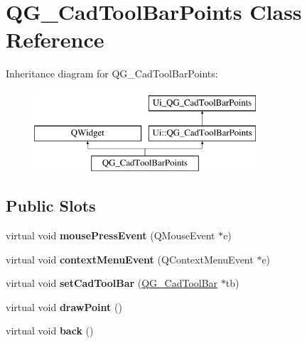 \hypertarget{classQG__CadToolBarPoints}{\section{Q\-G\-\_\-\-Cad\-Tool\-Bar\-Points Class Reference}
\label{classQG__CadToolBarPoints}
}
Inheritance diagram for Q\-G\-\_\-\-Cad\-Tool\-Bar\-Points\-:\begin{figure}[H]
\begin{center}
\leavevmode
\includegraphics[height=3.000000cm]{classQG__CadToolBarPoints}
\end{center}
\end{figure}
\subsection*{Public Slots}
\begin{DoxyCompactItemize}
\item 
\hypertarget{classQG__CadToolBarPoints_a3610211c4f791ab52c207d46aa3d1277}{virtual void {\bfseries mouse\-Press\-Event} (Q\-Mouse\-Event $\ast$e)}\label{classQG__CadToolBarPoints_a3610211c4f791ab52c207d46aa3d1277}

\item 
\hypertarget{classQG__CadToolBarPoints_a3369fef008cc55b257e9da29b2055d10}{virtual void {\bfseries context\-Menu\-Event} (Q\-Context\-Menu\-Event $\ast$e)}\label{classQG__CadToolBarPoints_a3369fef008cc55b257e9da29b2055d10}

\item 
\hypertarget{classQG__CadToolBarPoints_a672f378c657be098735032a4b9d9c8e0}{virtual void {\bfseries set\-Cad\-Tool\-Bar} (\hyperlink{classQG__CadToolBar}{Q\-G\-\_\-\-Cad\-Tool\-Bar} $\ast$tb)}\label{classQG__CadToolBarPoints_a672f378c657be098735032a4b9d9c8e0}

\item 
\hypertarget{classQG__CadToolBarPoints_a6f729f45b1d7f682978900a86fd3a31c}{virtual void {\bfseries draw\-Point} ()}\label{classQG__CadToolBarPoints_a6f729f45b1d7f682978900a86fd3a31c}

\item 
\hypertarget{classQG__CadToolBarPoints_ac952f3d14382f71e56d0a3b93bb488b3}{virtual void {\bfseries back} ()}\label{classQG__CadToolBarPoints_ac952f3d14382f71e56d0a3b93bb488b3}

\end{DoxyCompactItemize}
